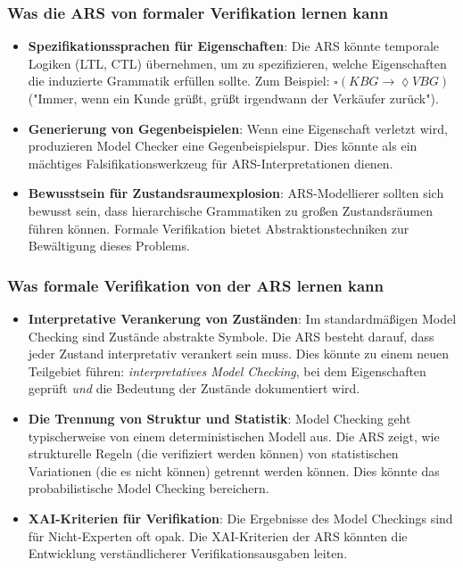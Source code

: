 \documentclass[12pt,a4paper]{article}
\begin{document}
\subsubsection{Was die ARS von formaler Verifikation lernen kann}

\begin{itemize}
    \item \textbf{Spezifikationssprachen für Eigenschaften}: Die ARS könnte 
    temporale Logiken (LTL, CTL) übernehmen, um zu spezifizieren, welche 
    Eigenschaften die induzierte Grammatik erfüllen sollte. Zum Beispiel: 
    $\square (KBG \rightarrow \lozenge VBG)$ ("Immer, wenn ein Kunde grüßt, 
    grüßt irgendwann der Verkäufer zurück").
    
    \item \textbf{Generierung von Gegenbeispielen}: Wenn eine Eigenschaft 
    verletzt wird, produzieren Model Checker eine Gegenbeispielspur. Dies 
    könnte als ein mächtiges Falsifikationswerkzeug für ARS-Interpretationen 
    dienen.
    
    \item \textbf{Bewusstsein für Zustandsraumexplosion}: ARS-Modellierer 
    sollten sich bewusst sein, dass hierarchische Grammatiken zu großen 
    Zustandsräumen führen können. Formale Verifikation bietet Abstraktionstechniken 
    zur Bewältigung dieses Problems.
\end{itemize}

\subsubsection{Was formale Verifikation von der ARS lernen kann}

\begin{itemize}
    \item \textbf{Interpretative Verankerung von Zuständen}: Im standardmäßigen 
    Model Checking sind Zustände abstrakte Symbole. Die ARS besteht darauf, 
    dass jeder Zustand interpretativ verankert sein muss. Dies könnte zu einem 
    neuen Teilgebiet führen: \textit{interpretatives Model Checking}, bei dem 
    Eigenschaften geprüft \textit{und} die Bedeutung der Zustände dokumentiert 
    wird.
    
    \item \textbf{Die Trennung von Struktur und Statistik}: Model Checking 
    geht typischerweise von einem deterministischen Modell aus. Die ARS zeigt, 
    wie strukturelle Regeln (die verifiziert werden können) von statistischen 
    Variationen (die es nicht können) getrennt werden können. Dies könnte das 
    probabilistische Model Checking bereichern.
    
    \item \textbf{XAI-Kriterien für Verifikation}: Die Ergebnisse des Model 
    Checkings sind für Nicht-Experten oft opak. Die XAI-Kriterien der ARS 
    könnten die Entwicklung verständlicherer Verifikationsausgaben leiten.
\end{itemize}
\end{document}
